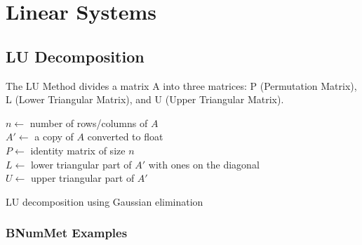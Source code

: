 \section*{Linear Systems}
\subsection*{LU Decomposition}
The LU Method divides a matrix A into three matrices: P (Permutation Matrix), L (Lower Triangular Matrix), and U (Upper Triangular Matrix).
\begin{algorithm}[H]
    \SetAlgoLined
    $n \gets$ number of rows/columns of $A$ \\
    $A' \gets$ a copy of $A$ converted to float \\
    $P \gets$ identity matrix of size $n$ \\
    $L \gets$ lower triangular part of $A'$ with ones on the diagonal \\
    $U \gets$ upper triangular part of $A'$ \\
    \caption{LU decomposition using Gaussian elimination}\label{alg:LU decomposition using Gaussian elimination}
\end{algorithm}
\subsubsection*{BNumMet Examples}



